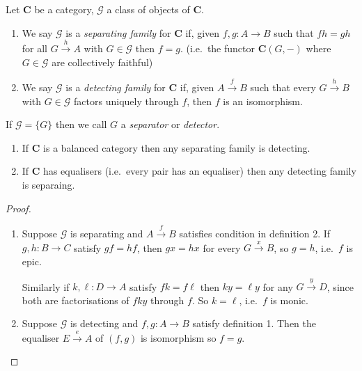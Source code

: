 \documentclass[a4paper]{article}
\renewcommand{\c}[1]{\mathbf{#1}}
\begin{document}
\begin{definition}
  Let \(\c C\) be a category, \(\mathcal G\) a class of objects of \(\c C\).
  \begin{enumerate}
  \item  We say \(\mathcal G\) is a \emph{separating family} for \(\c C\) if, given \(f, g: A \to B\) such that \(fh = gh\) for all \(G \xrightarrow{h} A\) with \(G \in \mathcal G\) then \(f = g\). (i.e.\ the functor \(\c C(G, -)\) where \(G \in \mathcal G\) are collectively faithful)
  \item We say \(\mathcal G\) is a \emph{detecting family}  for \(\c C\) if, given \(A \xrightarrow{f} B\) such that every \(G \xrightarrow{h} B\) with \(G \in \mathcal G\) factors uniquely through \(f\), then \(f\) is an isomorphism.
  \end{enumerate}

  If \(\mathcal G = \{G\}\) then we call \(G\) a \emph{separator} or \emph{detector}.
\end{definition}

\begin{lemma}\leavevmode
  \begin{enumerate}
  \item If \(\c C\) is a balanced category then any separating family is detecting.
  \item If \(\c C\) has equalisers (i.e.\ every pair has an equaliser) then any detecting family is separaing.
  \end{enumerate}
\end{lemma}

\begin{proof}\leavevmode
  \begin{enumerate}
  \item Suppose \(\mathcal G\) is separating and \(A \xrightarrow{f} B\) satisfies condition in definition 2.
    If \(g, h: B \to C\) satisfy \(gf = hf\), then \(gx = hx\) for every \(G \xrightarrow{x} B\), so \(g = h\), i.e.\ \(f\) is epic.

    Similarly if \(k, \ell: D \to A\) satisfy \(fk = f\ell\) then \(ky = \ell y\) for any \(G \xrightarrow{y} D\), since both are factorisations of \(fky\) through \(f\). So \(k = \ell\), i.e.\ \(f\) is monic.
  \item Suppose \(\mathcal G\) is detecting and \(f, g: A \to B\) satisfy definition 1. Then the equaliser \(E \xrightarrow{e} A\) of \((f, g)\) is isomorphism so \(f = g\).
  \end{enumerate}
\end{proof}
\end{document}
